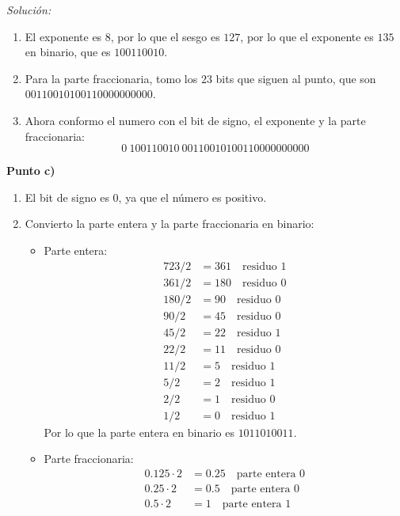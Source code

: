 \documentclass{article}
\newenvironment{solution}
    {\textit{Solución:}}
    {}
\begin{document}
\begin{solution}
\begin{enumerate}
\begin{itemize}
        \end{itemize}
    \item El exponente es $8$, por lo que el sesgo es $127$, por lo que el exponente es $135$ en binario, que es $100110010$.
    \item Para la parte fraccionaria, tomo los $23$ bits que siguen al punto, que son $00110010100110000000000$.
    \item Ahora conformo el numero con el bit de signo, el exponente y la parte fraccionaria:
    \begin{equation*}
        0 \ 100110010 \ 00110010100110000000000
    \end{equation*}
\end{enumerate}

\textbf{Punto c)}
\begin{enumerate}
    \item El bit de signo es $0$, ya que el número es positivo.
    \item Convierto la parte entera y la parte fraccionaria en binario:
    \begin{itemize}
        \item Parte entera:
        \begin{align*}
            723/2 &= 361 \quad \text{residuo } 1\\
            361/2 &= 180 \quad \text{residuo } 0\\
            180/2 &= 90 \quad \text{residuo } 0\\
            90/2 &= 45 \quad \text{residuo } 0\\
            45/2 &= 22 \quad \text{residuo } 1\\
            22/2 &= 11 \quad \text{residuo } 0\\
            11/2 &= 5 \quad \text{residuo } 1\\
            5/2 &= 2 \quad \text{residuo } 1\\
            2/2 &= 1 \quad \text{residuo } 0\\
            1/2 &= 0 \quad \text{residuo } 1
        \end{align*}
        Por lo que la parte entera en binario es $1011010011$.
        \item Parte fraccionaria:
        \begin{align*}
            0.125 \cdot 2 &= 0.25 \quad \text{parte entera } 0\\
            0.25 \cdot 2 &= 0.5 \quad \text{parte entera } 0\\
            0.5 \cdot 2 &= 1 \quad \text{parte entera } 1

\end{align*}
\end{itemize}
\end{enumerate}
\end{solution}
\end{document}
